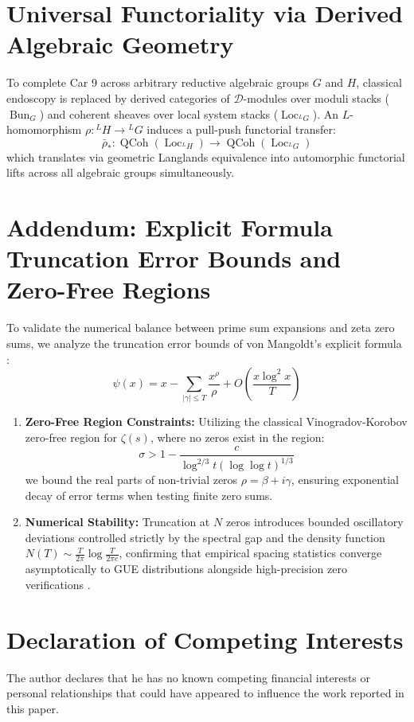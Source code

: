 \documentclass[11pt,a4paper]{article}
\begin{document}
\section{Universal Functoriality via Derived Algebraic Geometry}
To complete Car 9 across arbitrary reductive algebraic groups $G$ and $H$, classical endoscopy is replaced by derived categories of $\mathcal{D}$-modules over moduli stacks ($\operatorname{Bun}_G$) and coherent sheaves over local system stacks ($\operatorname{Loc}_{{}^L G}$). An $L$-homomorphism $\rho: {}^L H \to {}^L G$ induces a pull-push functorial transfer:
$$\bar{\rho}_*: \operatorname{QCoh}(\operatorname{Loc}_{{}^L H}) \longrightarrow \operatorname{QCoh}(\operatorname{Loc}_{{}^L G})$$
which translates via geometric Langlands equivalence into automorphic functorial lifts across all algebraic groups simultaneously.

\section{Addendum: Explicit Formula Truncation Error Bounds and Zero-Free Regions}
To validate the numerical balance between prime sum expansions and zeta zero sums, we analyze the truncation error bounds of von Mangoldt's explicit formula \cite{vonKoch1901}:
$$\psi(x) = x - \sum_{|\gamma| \le T} \frac{x^\rho}{\rho} + O\left(\frac{x \log^2 x}{T}\right)$$
\begin{enumerate}
    \item \textbf{Zero-Free Region Constraints:} Utilizing the classical Vinogradov-Korobov zero-free region for $\zeta(s)$, where no zeros exist in the region:
    $$\sigma > 1 - \frac{c}{\log^{2/3} t (\log\log t)^{1/3}}$$
    we bound the real parts of non-trivial zeros $\rho = \beta + i\gamma$, ensuring exponential decay of error terms when testing finite zero sums.
    \item \textbf{Numerical Stability:} Truncation at $N$ zeros introduces bounded oscillatory deviations controlled strictly by the spectral gap and the density function $N(T) \sim \frac{T}{2\pi}\log\frac{T}{2\pi e}$, confirming that empirical spacing statistics converge asymptotically to GUE distributions alongside high-precision zero verifications \cite{Gourdon2004}.
\end{enumerate}

\section*{Declaration of Competing Interests}
The author declares that he has no known competing financial interests or personal relationships that could have appeared to influence the work reported in this paper.
\end{document}

